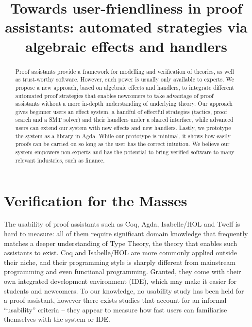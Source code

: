 \documentclass[sigconfl]{acmart}
\begin{document}
\title[Towards user-friendliness in theorem provers]{Towards user-friendliness
  in proof assistants: automated strategies \textbf{via} algebraic effects and handlers}



\begin{abstract}
Proof assistants provide a framework for modelling and verification of
theories, as well as trust-worthy software. However, such power is usually only
available to experts. We propose a new approach, based on algebraic effects and
handlers, to integrate different automated proof strategies that enables
newcomers to take advantage of proof assistants without a more in-depth
understanding of underlying theory. Our approach gives beginner users an effect
system, a handful of effectful strategies (tactics, proof search and a SMT
solver) and their handlers under a shared interface, while advanced users can
extend our system with new effects and new handlers. Lastly, we prototype the
system as a library in Agda. While our prototype is minimal, it shows how easily
proofs can be carried on so long as the user has the correct intuition. We
believe our system empowers non-experts and has the potential to bring verified
software to many relevant industries, such as finance.
\end{abstract}


\maketitle

\section{Verification for the Masses}

The usability of proof assistants such as Coq, Agda, Isabelle/HOL and Twelf is
hard to measure: all of them require significant domain knowledge that
frequently matches a deeper understanding of Type Theory, the theory that
enables such assistants to exist. Coq and Isabelle/HOL are more commonly applied
outside their niche, and their programming style is sharply different from
mainstream programming and even functional programming. Granted, they come with
their own integrated development environment (IDE), which may make it easier for
students and newcomers. To our knowledge, no usability study has been
held for a proof assistant, however there exists studies that account for
an informal ``usability'' criteria -- they appear to measure how fast users can
familiarise themselves with the system or IDE.
\end{document}
